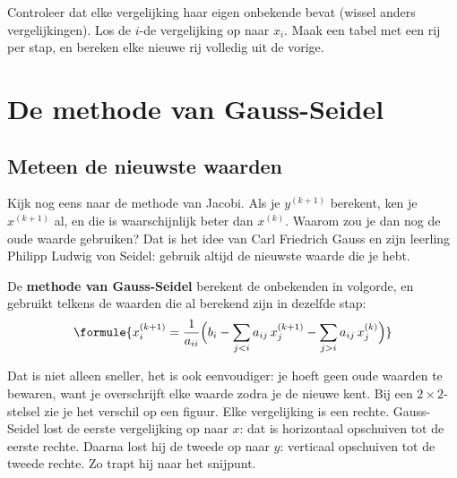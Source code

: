 \begin{werkwijze}
Controleer dat elke vergelijking haar eigen onbekende bevat (wissel anders vergelijkingen). Los de $i$-de vergelijking op naar $x_i$. Maak een tabel met een rij per stap, en bereken elke nieuwe rij volledig uit de vorige.
\end{werkwijze}


\begin{oefeningen}
\end{oefeningen}

\section{De methode van Gauss-Seidel}

\subsection{Meteen de nieuwste waarden}

Kijk nog eens naar de methode van Jacobi. Als je $y^{(k+1)}$ berekent, ken je $x^{(k+1)}$ al, en die is waarschijnlijk beter dan $x^{(k)}$. Waarom zou je dan nog de oude waarde gebruiken? Dat is het idee van Carl Friedrich Gauss en zijn leerling Philipp Ludwig von Seidel: gebruik altijd de nieuwste waarde die je hebt.

\begin{theorie}
De \textbf{\textcolor{accent}{methode van Gauss-Seidel}} berekent de onbekenden in volgorde, en gebruikt telkens de waarden die al berekend zijn in dezelfde stap:
\[
\formule{x_i^{(k+1)} = \frac{1}{a_{ii}} \Bigl( b_i - \sum_{j < i} a_{ij}\, x_j^{(k+1)} - \sum_{j > i} a_{ij}\, x_j^{(k)} \Bigr)}
\]
\end{theorie}

Dat is niet alleen sneller, het is ook eenvoudiger: je hoeft geen oude waarden te bewaren, want je overschrijft elke waarde zodra je de nieuwe kent. Bij een $2 \times 2$-stelsel zie je het verschil op een figuur. Elke vergelijking is een rechte. Gauss-Seidel lost de eerste vergelijking op naar $x$: dat is horizontaal opschuiven tot de eerste rechte. Daarna lost hij de tweede op naar $y$: verticaal opschuiven tot de tweede rechte. Zo trapt hij naar het snijpunt.

